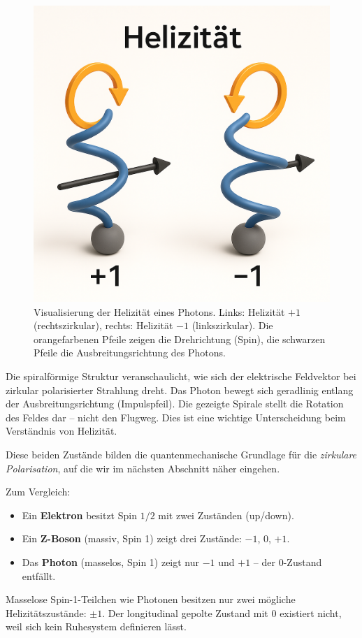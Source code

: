 \begin{figure}[H]
	\centering
	\includegraphics[width=0.65\linewidth]{bilder/Helizitaet.png}
	\caption{Visualisierung der Helizität eines Photons. Links: Helizität $+1$ (rechtszirkular), rechts: Helizität $-1$ (linkszirkular). Die orangefarbenen Pfeile zeigen die Drehrichtung (Spin), die schwarzen Pfeile die Ausbreitungsrichtung des Photons.}
	\label{fig:helizitaet}
\end{figure}

\begin{tcolorbox}[physikbox, title=Kommentar zur Darstellung]
	\label{box:Kommentar zur Darstellung}
	Die spiralförmige Struktur veranschaulicht, wie sich der elektrische Feldvektor bei zirkular polarisierter Strahlung dreht. Das Photon bewegt sich geradlinig entlang der Ausbreitungsrichtung (Impulspfeil). Die gezeigte Spirale stellt die Rotation des Feldes dar – nicht den Flugweg. Dies ist eine wichtige Unterscheidung beim Verständnis von Helizität.
\end{tcolorbox}
\medskip
Diese beiden Zustände bilden die quantenmechanische Grundlage für die \textit{zirkulare Polarisation}, auf die wir im nächsten Abschnitt näher eingehen.


Zum Vergleich:
\begin{itemize}
	\item Ein \textbf{Elektron} besitzt Spin $1/2$ mit zwei Zuständen (up/down).
	\item Ein \textbf{Z-Boson} (massiv, Spin 1) zeigt drei Zustände: $-1$, $0$, $+1$.
	\item Das \textbf{Photon} (masselos, Spin 1) zeigt nur $-1$ und $+1$ – der $0$-Zustand entfällt.
\end{itemize}
\medskip
\begin{tcolorbox}[physikbox, title=Didaktischer Merksatz]
	\label{box:didaktischerMerksatz}
	Masselose Spin-1-Teilchen wie Photonen besitzen nur zwei mögliche Helizitätszustände: \textbf{$\pm1$}. Der longitudinal gepolte Zustand mit $0$ existiert nicht, weil sich kein Ruhesystem definieren lässt.
\end{tcolorbox}
\medskip
